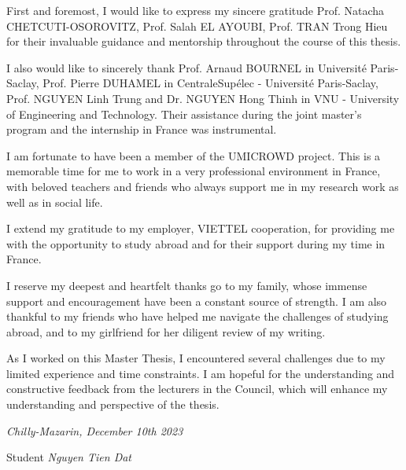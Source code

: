 First and foremost, I would like to express my sincere gratitude
Prof. Natacha CHETCUTI-OSOROVITZ,
Prof. Salah EL AYOUBI,
Prof. TRAN Trong Hieu
for their invaluable guidance and mentorship throughout the course of this thesis.

I also would like to sincerely thank
Prof. Arnaud BOURNEL in Université Paris-Saclay,
Prof. Pierre DUHAMEL in CentraleSupélec - Université Paris-Saclay,
Prof. NGUYEN Linh Trung and Dr. NGUYEN Hong Thinh in VNU - University of Engineering and Technology.
Their assistance during the joint master’s program and the internship in France was instrumental.

I am fortunate to have been a member of the UMICROWD project.
This is a memorable time for me to work in a very professional environment in France, with beloved teachers and friends who always support me in my research work as well as in social life.

I extend my gratitude to my employer, VIETTEL cooperation, for providing me with the opportunity to study abroad and for their support during my time in France.

I reserve my deepest and heartfelt thanks go to my family,
whose immense support and encouragement have been a constant source of strength.
I am also thankful to my friends who have helped me navigate the challenges of studying abroad,
and to my girlfriend for her diligent review of my writing.

As I worked on this Master Thesis, I encountered several challenges due to my limited experience and time constraints. I am hopeful for the understanding and constructive feedback from the lecturers in the Council, which will enhance my understanding and perspective of the thesis.

\begin{flushright}
	\textit{Chilly-Mazarin, December 10th 2023}

	Student
	\vspace{4cm}
	\textit{Nguyen Tien Dat}
\end{flushright}